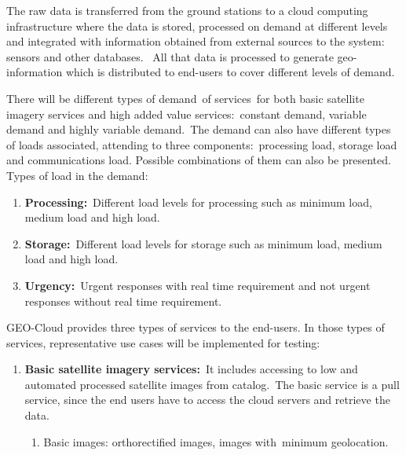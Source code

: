 \documentclass[a4paper]{article}
\newcounter{saveenum}
\newcommand\liststyleLFOxxxv{%
\renewcommand\theenumi{\alph{enumi}}
\renewcommand\theenumii{\alph{enumii}}
\renewcommand\theenumiii{\roman{enumiii}}
\renewcommand\theenumiv{\arabic{enumiv}}
\renewcommand\labelenumi{\theenumi)}
\renewcommand\labelenumii{\theenumii.}
\renewcommand\labelenumiii{\theenumiii.}
\renewcommand\labelenumiv{\theenumiv.}
}
\newcommand\liststyleLFOxxxiii{%
\renewcommand\theenumi{\arabic{enumi}}
\renewcommand\theenumii{\alph{enumii}}
\renewcommand\theenumiii{\roman{enumiii}}
\renewcommand\theenumiv{\arabic{enumiv}}
\renewcommand\labelenumi{\theenumi.}
\renewcommand\labelenumii{\theenumii.}
\renewcommand\labelenumiii{\theenumiii.}
\renewcommand\labelenumiv{\theenumiv.}
}
\begin{document}
\bigskip

The raw data is transferred from the ground stations to a cloud
computing infrastructure where the data is stored, processed on demand
at different levels and integrated with information obtained from
external sources to the system: sensors and other databases. \ All that
data is processed to generate geo-information which is distributed to
end-users to cover different levels of demand.\ 


\bigskip

There will be different types of demand\ of services\ for both basic
satellite imagery services and high added value services:\ constant
demand, variable demand and highly variable demand.\ The demand can
also have different types of loads associated, attending to three
components:\ processing load, storage load and communications load.
Possible combinations of them can also be presented. Types of load in
the demand:

\liststyleLFOxxxv
\setcounter{saveenum}{\value{enumi}}
\begin{enumerate}
\setcounter{enumi}{\value{saveenum}}
\item \textbf{Processing:}\ Different load levels for processing such as
minimum load, medium load and high load.
\item \textbf{Storage:}\ Different load levels for storage such as
minimum load, medium load and high load.
\item \textbf{Urgency}\textbf{:}\ Urgent responses with real time
requirement and not urgent responses without real time requirement.
\end{enumerate}
GEO-Cloud provides three types of services to the end-users. In those
types of services, representative use cases will be implemented for
testing:

\liststyleLFOxxxiii
\setcounter{saveenum}{\value{enumi}}
\begin{enumerate}
\setcounter{enumi}{\value{saveenum}}
\item \textbf{Basic satellite imagery services:}\ It includes accessing
to low and automated processed satellite images from catalog.\ The
basic service is a pull service, since the end users have to access the
cloud servers and retrieve the data.

\setcounter{saveenum}{\value{enumii}}
\begin{enumerate}
\setcounter{enumii}{\value{saveenum}}
\item Basic images: orthorectified images, images with\ minimum
geolocation.
\end{enumerate}
\end{enumerate}
\end{document}

